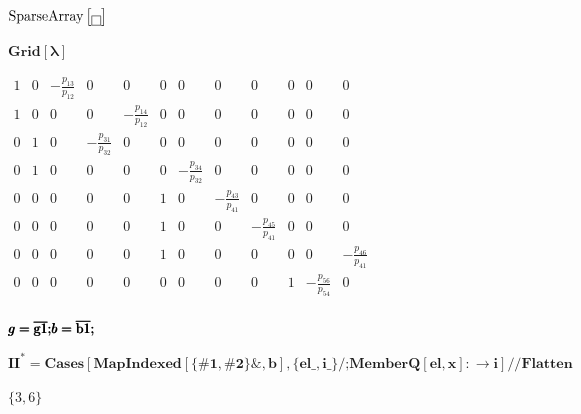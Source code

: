 \documentclass{article}
\newcommand{\unicode}[1]{{}}
\begin{document}
\begin{doublespace}
\noindent\(\text{SparseArray}\left[\fbox{$$}\right]\)
\end{doublespace}

\begin{doublespace}
\noindent\(\pmb{\text{Grid}[\lambda ]}\)
\end{doublespace}

\begin{doublespace}
\noindent\(\begin{array}{cccccccccccc}
 1 & 0 & -\frac{p_{1\unicode{f3d5}3}}{p_{1\unicode{f3d5}2}} & 0 & 0 & 0 & 0 & 0 & 0 & 0 & 0 & 0 \\
 1 & 0 & 0 & 0 & -\frac{p_{1\unicode{f3d5}4}}{p_{1\unicode{f3d5}2}} & 0 & 0 & 0 & 0 & 0 & 0 & 0 \\
 0 & 1 & 0 & -\frac{p_{3\unicode{f3d5}1}}{p_{3\unicode{f3d5}2}} & 0 & 0 & 0 & 0 & 0 & 0 & 0 & 0 \\
 0 & 1 & 0 & 0 & 0 & 0 & -\frac{p_{3\unicode{f3d5}4}}{p_{3\unicode{f3d5}2}} & 0 & 0 & 0 & 0 & 0 \\
 0 & 0 & 0 & 0 & 0 & 1 & 0 & -\frac{p_{4\unicode{f3d5}3}}{p_{4\unicode{f3d5}1}} & 0 & 0 & 0 & 0 \\
 0 & 0 & 0 & 0 & 0 & 1 & 0 & 0 & -\frac{p_{4\unicode{f3d5}5}}{p_{4\unicode{f3d5}1}} & 0 & 0 & 0 \\
 0 & 0 & 0 & 0 & 0 & 1 & 0 & 0 & 0 & 0 & 0 & -\frac{p_{4\unicode{f3d5}6}}{p_{4\unicode{f3d5}1}} \\
 0 & 0 & 0 & 0 & 0 & 0 & 0 & 0 & 0 & 1 & -\frac{p_{5\unicode{f3d5}6}}{p_{5\unicode{f3d5}4}} & 0 \\
\end{array}\)
\end{doublespace}

\begin{doublespace}
\noindent\(\pmb{g=\overline{\text{g1}};}\\
\pmb{b=\overline{\text{b1}};}\)
\end{doublespace}

\begin{doublespace}
\noindent\(\pmb{\text{II}^*=\text{Cases}[\text{MapIndexed}[\{\text{$\#$1},\text{$\#$2}\}\&,b],\{\text{el$\_$},\text{i$\_$}\}\text{/;}\text{MemberQ}[\text{el},x]:\to
i]\text{//}\text{Flatten}}\)
\end{doublespace}

\begin{doublespace}
\noindent\(\{3,6\}\)
\end{doublespace}
\end{document}
